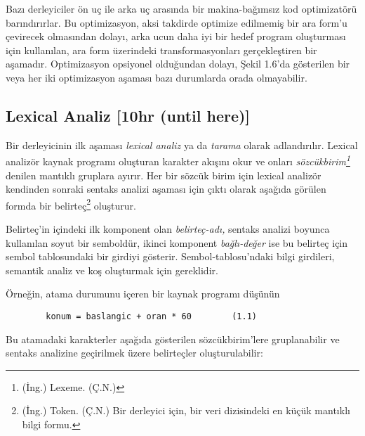 \documentclass{book}
\begin{document}
Bazı derleyiciler ön uç ile arka uç arasında bir makina-bağımsız kod optimizatörü barındırırlar. Bu optimizasyon, aksi takdirde optimize edilmemiş bir ara form'u çevirecek olmasından dolayı, arka ucun daha iyi bir hedef program oluşturması için kullanılan, ara form üzerindeki transformasyonları gerçekleştiren bir aşamadır. Optimizasyon opsiyonel olduğundan dolayı, Şekil 1.6'da gösterilen bir veya her iki optimizasyon aşaması bazı durumlarda orada olmayabilir.

\subsection{Lexical Analiz [10hr (until here)]}

\setcounter{footnote}{0}

Bir derleyicinin ilk aşaması \textit{lexical analiz} ya da \textit{tarama} olarak adlandırılır. Lexical analizör kaynak programı oluşturan karakter akışını okur ve onları \textit{sözcükbirim\footnote{(İng.) Lexeme. (Ç.N.)}} denilen mantıklı gruplara ayırır. Her bir sözcük birim için lexical analizör kendinden sonraki sentaks analizi aşaması için çıktı olarak aşağıda görülen formda bir belirteç\footnote{(İng.) Token. (Ç.N.) Bir derleyici için, bir veri dizisindeki en küçük mantıklı bilgi formu.} oluşturur.

{}


Belirteç'in içindeki ilk komponent olan \textit{belirteç-adı,} sentaks analizi boyunca kullanılan soyut bir semboldür, ikinci komponent \textit{bağlı-değer} ise bu belirteç için sembol tablosundaki bir girdiyi gösterir. Sembol-tablosu'ndaki bilgi girdileri, semantik analiz ve koş oluşturmak için gereklidir.

Örneğin, atama durumunu içeren bir kaynak programı düşünün

\begin{lstlisting}
 		konum = baslangic + oran * 60        (1.1)
\end{lstlisting}

Bu atamadaki karakterler aşağıda gösterilen sözcükbirim'lere gruplanabilir ve sentaks analizine geçirilmek üzere belirteçler oluşturulabilir:
\end{document}
